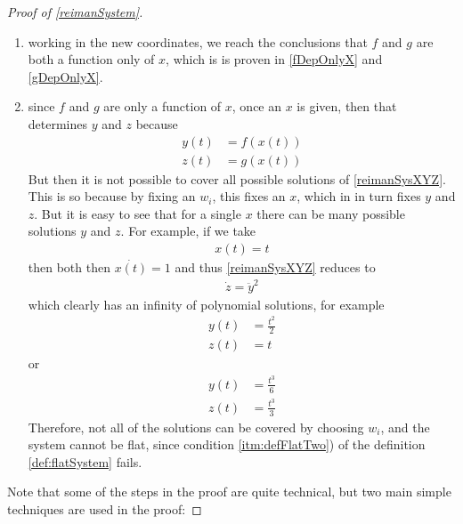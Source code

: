 \documentclass[12pt]{article}
\begin{document}
\begin{proof}[ Proof of \ref{reimanSystem}]
\begin{enumerate}
  \item working in the new coordinates, we reach the conclusions that $f$ and $g$ are both a
  function only of $x$, which is is proven in \ref{fDepOnlyX} and \ref{gDepOnlyX}.
  
  \item since $f$ and $g$ are only a function of $x$, once an $x$ is given, then that determines $y$ and $z$ because
  \begin{equation}\begin{aligned}
    y(t) &= f(x(t)) \\
    z(t) &= g(x(t))
  \end{aligned}\end{equation}
  But then it is not possible to cover all possible solutions of \eqref{reimanSysXYZ}.
  This is so because by fixing an $w_i$, this fixes an $x$, which in
  in turn fixes $y$ and $z$. But it is easy to see that for a single
  $x$ there can be many possible solutions $y$ and $z$. For example,
  if we take
  \begin{equation}\begin{aligned}
    x(t) = t
  \end{aligned}\end{equation}
  then both then $\dot{x(t)} = 1$ and thus \eqref{reimanSysXYZ} reduces to
  \begin{equation}\begin{aligned}
    \dot{z} = \ddot{y}^2
  \end{aligned}\end{equation}
  which clearly has an infinity of polynomial solutions, for example
  \begin{equation}\begin{aligned}
    y(t) &= \frac{t^2}{2} \\
    z(t) &= t
  \end{aligned}\end{equation}
  or
  \begin{equation}\begin{aligned}
    y(t) &= \frac{t^3}{6} \\
    z(t) &= \frac{t^3}{3}
  \end{aligned}\end{equation}
  Therefore, not all of the solutions can be covered by choosing $w_i$,
  and the system cannot be flat, since condition \ref{itm:defFlatTwo}) of 
  the definition \ref{def:flatSystem} fails.
\end{enumerate}

Note that some of the steps in the proof are quite technical, but two main simple
techniques are used in the proof:


\end{proof}
\end{document}
